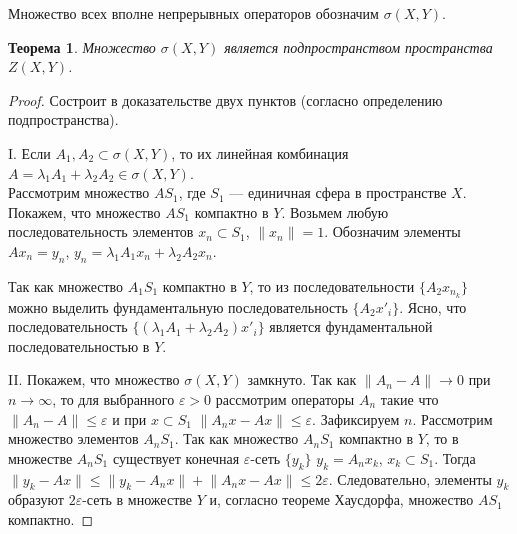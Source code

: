 \documentclass[12pt,a4paper,titlepage, oneside]{book}
\theoremstyle{definition}
\theoremstyle{plain}
\newtheorem*{theorem}{Теорема}
\theoremstyle{remark}
\theoremstyle{remark}
\theoremstyle{remark}
\theoremstyle{plain}
\theoremstyle{plain}
\begin{document}
Множество всех вполне непрерывных операторов обозначим $\sigma(X,Y)$.
\begin{theorem}Множество $\sigma(X,Y)$ является подпространством пространства $Z(X, Y)$.
\end{theorem}
\begin{proof}Состроит в доказательстве двух пунктов (согласно определению подпространства).

I. Если $A_1, A_2 \subset \sigma(X,Y)$, то их линейная комбинация $A=\lambda_1 A_1+\lambda_2 A_2\in \sigma(X,Y)$.\\
Рассмотрим множество $AS_1$, где $S_1$ --- единичная сфера в пространстве $X$. Покажем, что множество $AS_1$ компактно в $Y$. Возьмем любую последовательность элементов $x_n \subset S_1$, $\lVert x_n \rVert=1$. Обозначим элементы $Ax_n=y_n$, $y_n=\lambda_1 A_1 x_n+\lambda_2 A_2 x_n$.

Так как множество $A_1S_1$ компактно в $Y$, то из последовательности $\lbrace A_2x_{n_k} \rbrace$ можно выделить фундаментальную последовательность $\lbrace A_2x'_i \rbrace$. Ясно, что последовательность $\lbrace (\lambda_1 A_1+\lambda_2 A_2)x'_i \rbrace$ является фундаментальной последовательностью в $Y$.

II. Покажем, что множество $\sigma(X,Y)$ замкнуто. Так как $\lVert A_n-A \rVert \to 0$ при $n\to \infty$, то для выбранного $\varepsilon > 0$ рассмотрим операторы $A_n$ такие что $\lVert A_n-A \rVert \leq  \varepsilon$ и при $x \subset S_1$ $\lVert A_n x-Ax\rVert \leq  \varepsilon$. Зафиксируем $n$. Рассмотрим множество элементов $A_n S_1$. Так как множество $A_n S_1$ компактно в $Y$, то в множестве $A_n S_1$ существует конечная $\varepsilon$-сеть $\lbrace y_k \rbrace$ $y_k=A_n x_k$, $x_k \subset S_1$. Тогда $\lVert y_k - Ax\rVert \leq \lVert y_k - A_n x\rVert + \lVert A_n x - Ax\rVert \leq 2\varepsilon$. Следовательно, элементы $y_k$ образуют $2\varepsilon$-сеть в множестве $Y$ и, согласно теореме Хаусдорфа, множество $AS_1$ компактно.
\end{proof}
\end{document}
